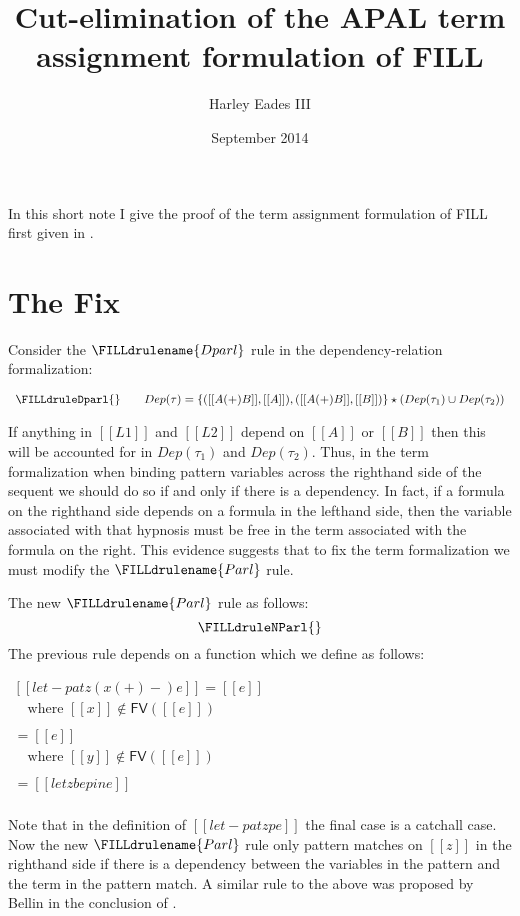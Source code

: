\documentclass{article}
\title{Cut-elimination of the APAL term assignment formulation of FILL}
\author{Harley Eades III}
\date{September 2014}
\begin{document}
\maketitle

In this short note I give the proof of the term assignment formulation
of FILL first given in \cite{Hyland:1993}.

\section{The Fix}
\label{sec:the_fix}
Consider the $\FILLdrulename{Dparl}$ rule in the dependency-relation
formalization:
\begin{center}
  \begin{math}
    \begin{array}{lll}
      \FILLdruleDparl{}
      && Dep(\tau) = \{([[A (+) B]], [[A]]), ([[A (+) B]], [[B]])\}
      \star (Dep(\tau_1) \cup Dep(\tau_2))
    \end{array}
  \end{math}
\end{center}
If anything in $[[L1]]$ and $[[L2]]$ depend on $[[A]]$ or $[[B]]$ then
this will be accounted for in $Dep(\tau_1)$ and $Dep(\tau_2)$.  Thus,
in the term formalization when binding pattern variables across the
righthand side of the sequent we should do so if and only if there is
a dependency.  In fact, if a formula on the righthand side depends on
a formula in the lefthand side, then the variable associated with
that hypnosis must be free in the term associated with the formula on
the right.  This evidence suggests that to fix the term formalization
we must modify the $\FILLdrulename{Parl}$ rule.

The new $\FILLdrulename{Parl}$ rule as follows:
\[
\FILLdruleNParl{}
\]
The previous rule depends on a function which we define as follows:
\begin{center}
  \begin{math}
    \begin{array}{lll}      
      [[let-pat z (x (+) -) e]] = [[e]]\\
      \,\,\,\,\,\,\text{where } [[x]] \not\in \mathsf{FV}([[e]])\\
      & \\
      [[let-pat z (- (+) y) e]] = [[e]]\\
      \,\,\,\,\,\,\text{where } [[y]] \not\in \mathsf{FV}([[e]])\\
      & \\
      [[let-pat z p e]] = [[let z be p in e]]\\
    \end{array}
  \end{math}
\end{center}
Note that in the definition of $[[let-pat z p e]]$ the final case is a
catchall case.  Now the new $\FILLdrulename{Parl}$ rule only pattern
matches on $[[z]]$ in the righthand side if there is a dependency
between the variables in the pattern and the term in the pattern
match.  A similar rule to the above was proposed by Bellin in the
conclusion of \cite{Bierman:1996}.
\end{document}
